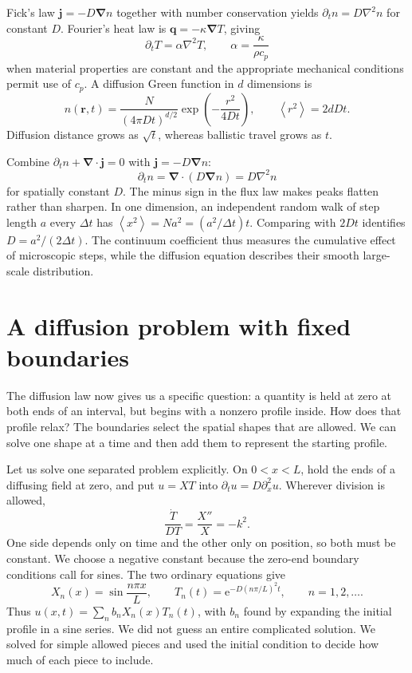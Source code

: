 \documentclass[11pt,oneside]{book}
\newcommand{\ee}{\mathrm{e}}
\newcommand{\vect}[1]{\boldsymbol{#1}}
\newcommand{\grad}{\boldsymbol{\nabla}}
\newcommand{\lap}{\nabla^2}
\newcommand{\avg}[1]{\left\langle #1\right\rangle}
\theoremstyle{reviewstyle}
\begin{document}
Fick's law $\vect j=-D\grad n$ together with number conservation yields $\partial_t n=D\lap n$ for constant $D$. Fourier's heat law is $\vect q=-\kappa\grad T$, giving
\begin{equation}
\partial_tT=\alpha\lap T,\qquad \alpha=\frac{\kappa}{\rho c_p}
\end{equation}
when material properties are constant and the appropriate mechanical conditions permit use of $c_p$. A diffusion Green function in $d$ dimensions is
\begin{equation}
n(\vect r,t)=\frac{N}{(4\pi Dt)^{d/2}}\exp\left(-\frac{r^2}{4Dt}\right),\qquad \avg{r^2}=2dDt.
\end{equation}
Diffusion distance grows as $\sqrt t$, whereas ballistic travel grows as $t$.

Combine $\partial_tn+\grad\cdot\vect j=0$ with $\vect j=-D\grad n$:
\begin{equation}
\partial_tn=\grad\cdot(D\grad n)=D\lap n
\end{equation}
for spatially constant $D$. The minus sign in the flux law makes peaks flatten rather than sharpen. In one dimension, an independent random walk of step length $a$ every $\Delta t$ has $\avg{x^2}=Na^2=(a^2/\Delta t)t$. Comparing with $2Dt$ identifies $D=a^2/(2\Delta t)$. The continuum coefficient thus measures the cumulative effect of microscopic steps, while the diffusion equation describes their smooth large-scale distribution.

\section{A diffusion problem with fixed boundaries}
The diffusion law now gives us a specific question: a quantity is held at zero at both ends of an interval, but begins with a nonzero profile inside. How does that profile relax? The boundaries select the spatial shapes that are allowed. We can solve one shape at a time and then add them to represent the starting profile.

Let us solve one separated problem explicitly. On $0<x<L$, hold the ends of a diffusing field at zero, and put $u=XT$ into $\partial_tu=D\partial_x^2u$. Wherever division is allowed,
\begin{equation}
\frac{\dot T}{DT}=\frac{X''}{X}=-k^2.
\end{equation}
One side depends only on time and the other only on position, so both must be constant. We choose a negative constant because the zero-end boundary conditions call for sines. The two ordinary equations give
\begin{equation}
X_n(x)=\sin\frac{n\pi x}{L},\qquad
T_n(t)=\ee^{-D(n\pi/L)^2t},\qquad n=1,2,\ldots.
\end{equation}
Thus $u(x,t)=\sum_n b_nX_n(x)T_n(t)$, with $b_n$ found by expanding the initial profile in a sine series. We did not guess an entire complicated solution. We solved for simple allowed pieces and used the initial condition to decide how much of each piece to include.
\end{document}
